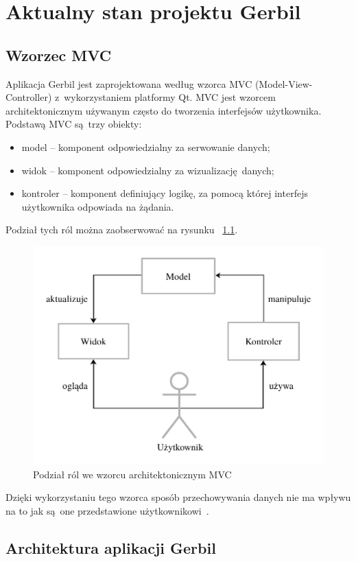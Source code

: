 \chapter{Aktualny stan projektu Gerbil}

 \section{Wzorzec MVC}

Aplikacja Gerbil jest zaprojektowana według wzorca MVC (Model-View-Controller) z~wykorzystaniem platformy Qt. MVC jest wzorcem architektonicznym używanym często do tworzenia interfejsów użytkownika. Podstawą MVC są trzy obiekty:
\begin{itemize}
	\item model -- komponent odpowiedzialny za serwowanie danych;
	\item widok -- komponent odpowiedzialny za wizualizację danych;
	\item kontroler -- komponent definiujący logikę, za pomocą której interfejs użytkownika odpowiada na żądania.
\end{itemize}
Podział tych ról można zaobserwować na rysunku ~\ref{fig:mvc}.

\begin{figure}[ht]
	\centering
	\includegraphics[width=0.7\linewidth]{rys04/mvc}
	\caption{Podział ról we wzorcu architektonicznym MVC}
	\label{fig:mvc}	
\end{figure}

Dzięki wykorzystaniu tego wzorca sposób przechowywania danych nie ma wpływu na to jak są one przedstawione użytkownikowi~\cite{Qtdoc}.

\section {Architektura aplikacji Gerbil}

